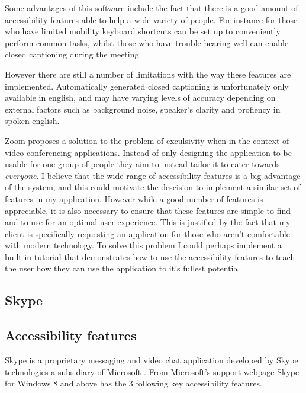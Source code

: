 Some advantages of this software include the fact that there
is a good amount of accessibility features able to help a wide
variety of people. For instance for those who have limited 
mobility keyboard shortcuts can be set up to conveniently 
perform common tasks, whilst those who have trouble hearing
well can enable closed captioning during the meeting.

\vspace{0.2cm}

However there are still a number of limitations with the way 
these features are implemented. Automatically generated 
closed captioning is unfortunately only available in english,
and may have varying levels of accuracy depending on external
factors such as background noise, speaker's clarity and 
profiency in spoken english.

\vspace{0.2cm}

Zoom proposes a solution to the problem of exculsivity when in 
the context of video conferencing applications. Instead of only
designing the application to be usable for one group of people
they aim to instead tailor it to cater towards 
\textit{everyone}. I believe that the wide range of
accessibility features is a big advantage of the system, and 
this could motivate the descision to implement a similar set
of features in my application. However while a good number of 
features is appreciable, it is also necessary to ensure that 
these features are simple to find and to use for an optimal 
user experience. This is justified by the fact that my client
is specifically requesting an application for those who aren't
comfortable with modern technology. To solve this problem I 
could perhaps implement a built-in tutorial that demonstrates 
how to use the accessibility features to teach the user how 
they can use the application to it's fullest potential.

\subsection{Skype}

\subsection*{Accessibility features}

Skype is a proprietary messaging and video chat application
developed by Skype technologies a subsidiary of Microsoft 
\cite{skype}. From Microsoft's support webpage Skype for 
Windows 8 and above has the 3 following key accessibility 
features.

